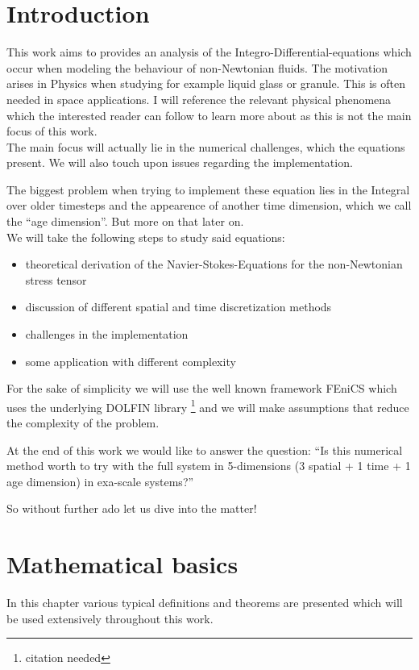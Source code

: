 \documentclass[12pt,a4paper]{scrartcl}
\numberwithin{equation}{section} %
\theoremstyle{definition}
\theoremstyle{plain}
\begin{document}
\section{Introduction}
This work aims to provides an analysis of the Integro-Differential-equations which occur when modeling the behaviour of non-Newtonian fluids. The motivation arises in Physics when studying for example liquid glass or granule. This is often needed in space applications. I will reference the relevant physical phenomena which the interested reader can follow to learn more about as this is not the main focus of this work.\\
The main focus will actually lie in the numerical challenges, which the equations present. We will also touch upon issues regarding the implementation.
\par 
The biggest problem when trying to implement these equation lies in the Integral over older timesteps and the appearence of another time dimension, which we call the \enquote{age dimension}. But more on that later on.\\
We will take the following steps to study said equations:
\begin{itemize}
    \item theoretical derivation of the Navier-Stokes-Equations for the non-Newtonian stress tensor
    \item discussion of different spatial and time discretization methods
    \item challenges in the implementation
    \item some application with different complexity 
\end{itemize}
For the sake of simplicity we will use the well known framework FEniCS \cite{Alnaes2012a}\cite{AlnaesBlechta2015a}\cite{AlnaesEtAl2012}\cite{AlnaesLoggEtAl2012a} which uses the underlying DOLFIN library \footnote{citation needed} and we will make assumptions that reduce the complexity of the problem. \par 
At the end of this work we would like to answer the question: \enquote{Is this numerical method worth to try with the full system in 5-dimensions (3 spatial + 1 time  + 1 age dimension) in exa-scale systems?}\par 
So without further ado let us dive into the matter!
\newpage
\section{Mathematical basics}
In this chapter various typical definitions and theorems are presented which will be used extensively throughout this work.
\end{document}
